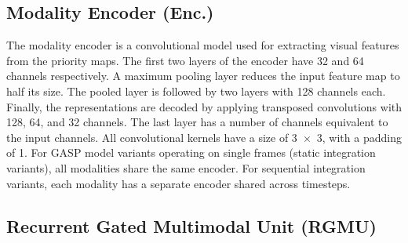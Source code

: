 \documentclass{article}
\begin{document}
\subsection{Modality Encoder (Enc.)}
The modality encoder is a convolutional model used for extracting visual features from the priority maps. 
The first two layers of the encoder have 32 and 64 channels respectively. A maximum pooling layer reduces the input feature map to half its size. The pooled layer is followed by two layers with 128 channels each. Finally, the representations are decoded by applying transposed convolutions with 128, 64, and 32 channels. The last layer has a number of channels equivalent to the input channels. All convolutional kernels have a size of 3~$\times$~3, with a padding of 1. For GASP model variants operating on single frames (static integration variants), all modalities share the same encoder. For sequential integration variants, each modality has a separate encoder shared across timesteps.


\subsection{Recurrent Gated Multimodal Unit (RGMU)}
\end{document}
